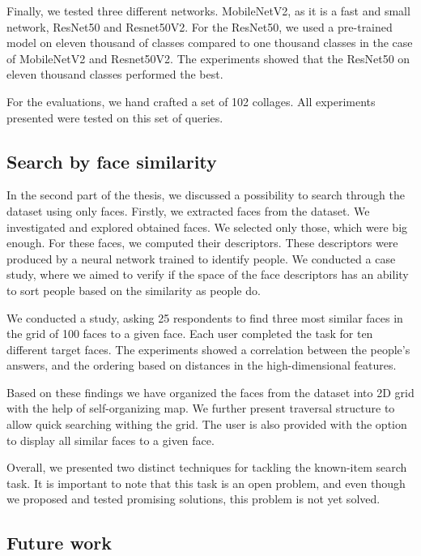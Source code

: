 Finally, we tested three different networks. MobileNetV2, as it is a fast and small network, ResNet50 and Resnet50V2. For the ResNet50, we used a pre-trained model on eleven thousand of classes compared to one thousand classes in the case of MobileNetV2 and Resnet50V2. The experiments showed that the ResNet50 on eleven thousand classes performed the best.

For the evaluations, we hand crafted a set of 102 collages. All experiments presented were tested on this set of queries.

\subsection*{Search by face similarity}

In the second part of the thesis, we discussed a possibility to search through the dataset using only faces. Firstly, we extracted faces from the dataset. We investigated and explored obtained faces. We selected only those, which were big enough. For these faces, we computed their descriptors. These descriptors were produced by a neural network trained to identify people. We conducted a case study, where we aimed to verify if the space of the face descriptors has an ability to sort people based on the similarity as people do.

We conducted a study, asking 25 respondents to find three most similar faces in the grid of 100 faces to a given face. Each user completed the task for ten different target faces. The experiments showed a correlation between the people's answers, and the ordering based on distances in the high-dimensional features.

Based on these findings we have organized the faces from the dataset into 2D grid with the help of self-organizing map. We further present traversal structure to allow quick searching withing the grid. The user is also provided with the option to display all similar faces to a given face.

\vspace{1em}

Overall, we presented two distinct techniques for tackling the known-item search task. It is important to note that this task is an open problem, and even though we proposed and tested promising solutions, this problem is not yet solved. 

\subsection*{Future work}

